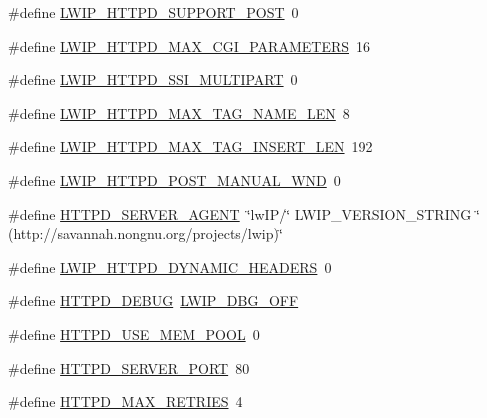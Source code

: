 \begin{DoxyCompactItemize}
\item 
\#define \hyperlink{group__httpd__opts_gacbea06ce33933e3ef2f2f1834a21cc2c}{L\+W\+I\+P\+\_\+\+H\+T\+T\+P\+D\+\_\+\+S\+U\+P\+P\+O\+R\+T\+\_\+\+P\+O\+ST}~0
\item 
\#define \hyperlink{group__httpd__opts_ga872adc1562d87d8b445f2231d5bab77a}{L\+W\+I\+P\+\_\+\+H\+T\+T\+P\+D\+\_\+\+M\+A\+X\+\_\+\+C\+G\+I\+\_\+\+P\+A\+R\+A\+M\+E\+T\+E\+RS}~16
\item 
\#define \hyperlink{group__httpd__opts_ga3167d52d20cf90857e2c809b92458bf0}{L\+W\+I\+P\+\_\+\+H\+T\+T\+P\+D\+\_\+\+S\+S\+I\+\_\+\+M\+U\+L\+T\+I\+P\+A\+RT}~0
\item 
\#define \hyperlink{group__httpd__opts_gacb2d74a4aa50287cf55c93d0aa4bcee1}{L\+W\+I\+P\+\_\+\+H\+T\+T\+P\+D\+\_\+\+M\+A\+X\+\_\+\+T\+A\+G\+\_\+\+N\+A\+M\+E\+\_\+\+L\+EN}~8
\item 
\#define \hyperlink{group__httpd__opts_ga9764ba9504923caf9cdd483479334ef5}{L\+W\+I\+P\+\_\+\+H\+T\+T\+P\+D\+\_\+\+M\+A\+X\+\_\+\+T\+A\+G\+\_\+\+I\+N\+S\+E\+R\+T\+\_\+\+L\+EN}~192
\item 
\#define \hyperlink{group__httpd__opts_ga81de5c62c846e73ab59c4cb46264fd6f}{L\+W\+I\+P\+\_\+\+H\+T\+T\+P\+D\+\_\+\+P\+O\+S\+T\+\_\+\+M\+A\+N\+U\+A\+L\+\_\+\+W\+ND}~0
\item 
\#define \hyperlink{group__httpd__opts_gafb2115e763ed3163a3e204a0ba53edb9}{H\+T\+T\+P\+D\+\_\+\+S\+E\+R\+V\+E\+R\+\_\+\+A\+G\+E\+NT}~\char`\"{}lw\+IP/\char`\"{} L\+W\+I\+P\+\_\+\+V\+E\+R\+S\+I\+O\+N\+\_\+\+S\+T\+R\+I\+NG \char`\"{} (http\+://savannah.\+nongnu.\+org/projects/lwip)\char`\"{}
\item 
\#define \hyperlink{group__httpd__opts_ga75932fc5eeb9abeddfdaf8413574c6d7}{L\+W\+I\+P\+\_\+\+H\+T\+T\+P\+D\+\_\+\+D\+Y\+N\+A\+M\+I\+C\+\_\+\+H\+E\+A\+D\+E\+RS}~0
\item 
\#define \hyperlink{group__httpd__opts_ga33cd73e701130f8fc3dc7db0a3013aa1}{H\+T\+T\+P\+D\+\_\+\+D\+E\+B\+UG}~\hyperlink{group__debugging__levels_gadab1cdc3f45939a3a5c9a3d7e04987e1}{L\+W\+I\+P\+\_\+\+D\+B\+G\+\_\+\+O\+FF}
\item 
\#define \hyperlink{group__httpd__opts_gabb13219495a813fceaafa954a238a924}{H\+T\+T\+P\+D\+\_\+\+U\+S\+E\+\_\+\+M\+E\+M\+\_\+\+P\+O\+OL}~0
\item 
\#define \hyperlink{group__httpd__opts_ga2b058c5d1bd67e5d7cb260166e3ace50}{H\+T\+T\+P\+D\+\_\+\+S\+E\+R\+V\+E\+R\+\_\+\+P\+O\+RT}~80
\item 
\#define \hyperlink{group__httpd__opts_gad92e78e19fd3ab2af42750e83ed73fd5}{H\+T\+T\+P\+D\+\_\+\+M\+A\+X\+\_\+\+R\+E\+T\+R\+I\+ES}~4

\end{DoxyCompactItemize}
